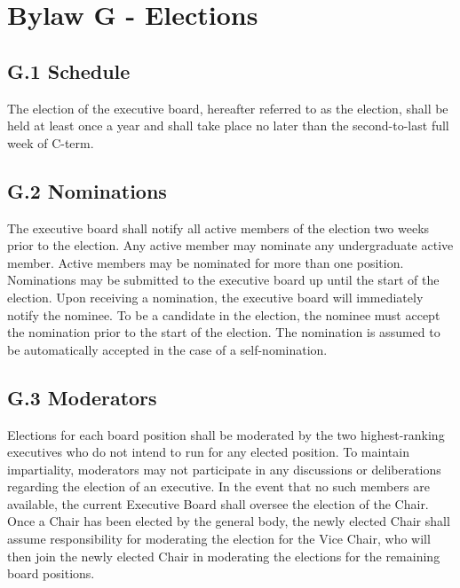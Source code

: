 \documentclass[11pt,a4paper]{article}
\begin{document}
\section*{Bylaw G - Elections}
\label{G}

\subsection*{G.1 Schedule}
The election of the executive board, hereafter referred to as the election, shall be held at least once a year and shall take place no later than the second-to-last full week of C-term.

\subsection*{G.2 Nominations}
The executive board shall notify all active members of the election two weeks prior to the election. Any active member may nominate any undergraduate active member. Active members may be nominated for more than one position. Nominations may be submitted to the executive board up until the start of the election. Upon receiving a nomination, the executive board will immediately notify the nominee. To be a candidate in the election, the nominee must accept the nomination prior to the start of the election. The nomination is assumed to be automatically accepted in the case of a self-nomination.

\subsection*{G.3 Moderators}

Elections for each board position shall be moderated by the two highest-ranking executives who do not intend to run for any elected position. To maintain impartiality, moderators may not participate in any discussions or deliberations regarding the election of an executive. In the event that no such members are available, the current Executive Board shall oversee the election of the Chair. Once a Chair has been elected by the general body, the newly elected Chair shall assume responsibility for moderating the election for the Vice Chair, who will then join the newly elected Chair in moderating the elections for the remaining board positions.
\end{document}
